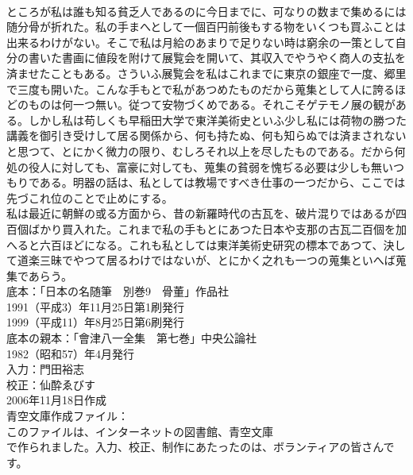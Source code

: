 \documentclass[8pt]{extreport}
\begin{document}
\begin{CJK}{UTF8}{min}
\\	ところが私は誰も知る貧乏人であるのに今日までに、可なりの数まで集めるには随分骨が折れた。私の手まへとして一個百円前後もする物をいくつも買ふことは出来るわけがない。そこで私は月給のあまりで足りない時は窮余の一策として自分の書いた書画に値段を附けて展覧会を開いて、其収入でやうやく商人の支払を済ませたこともある。さういふ展覧会を私はこれまでに東京の銀座で一度、郷里で三度も開いた。こんな手もとで私があつめたものだから蒐集として人に誇るほどのものは何一つ無い。従つて安物づくめである。それこそゲテモノ展の観がある。しかし私は苟しくも早稲田大学で東洋美術史といふ少し私には荷物の勝つた講義を御引き受けして居る関係から、何も持たぬ、何も知らぬでは済まされないと思つて、とにかく微力の限り、むしろそれ以上を尽したものである。だから何処の役人に対しても、富豪に対しても、蒐集の貧弱を愧ぢる必要は少しも無いつもりである。明器の話は、私としては教場ですべき仕事の一つだから、ここでは先づこれ位のことで止めにする。
\\	私は最近に朝鮮の或る方面から、昔の新羅時代の古瓦を、破片混りではあるが四百個ばかり買入れた。これまで私の手もとにあつた日本や支那の古瓦二百個を加へると六百ほどになる。これも私としては東洋美術史研究の標本であつて、決して道楽三昧でやつて居るわけではないが、とにかく之れも一つの蒐集といへば蒐集であらう。
\\	底本：「日本の名随筆　別巻9　骨董」作品社
\\	1991（平成3）年11月25日第1刷発行
\\	1999（平成11）年8月25日第6刷発行
\\	底本の親本：「會津八一全集　第七巻」中央公論社
\\	1982（昭和57）年4月発行
\\	入力：門田裕志
\\	校正：仙酔ゑびす
\\	2006年11月18日作成
\\	青空文庫作成ファイル：
\\	このファイルは、インターネットの図書館、青空文庫
\\	で作られました。入力、校正、制作にあたったのは、ボランティアの皆さんです。
\end{CJK}
\end{document}
